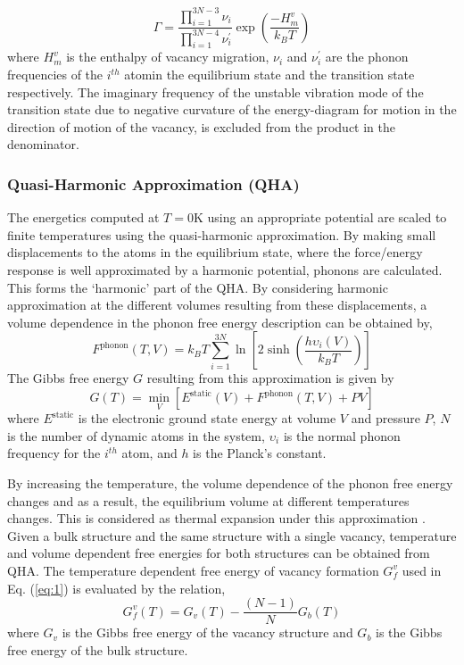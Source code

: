 \documentclass{article}
\begin{document}
%
\begin{equation} \label{eq:6}
\Gamma = \dfrac{\displaystyle \prod_{i=1}^{3N-3}\nu_i}{\displaystyle \prod_{i=1}^{3N-4}\nu_i^\prime} \exp\left(\dfrac{-H^v_m}{k_BT}\right)
\end{equation}
%
where $H^v_m$ is the enthalpy of vacancy migration, $\nu_i$ and $\nu_i^\prime$ are the phonon frequencies of the $i^{th}$ atomin the equilibrium state and the transition state respectively. The imaginary frequency of the unstable vibration mode of the transition state due to negative curvature of the energy-diagram for motion in the direction of motion of the vacancy, is excluded from the product in the denominator.

\subsubsection{Quasi-Harmonic Approximation (QHA)} 

\noindent The energetics computed at $T=0$K using an appropriate potential are scaled to finite temperatures using the quasi-harmonic approximation. By making small displacements to the atoms in the equilibrium state, where the force/energy response is well approximated by a harmonic potential, phonons are calculated. This forms the \enquote*{harmonic} part of the QHA. By considering harmonic approximation at the different volumes resulting from these displacements, a volume dependence in the phonon free energy description can be obtained by,
%
\begin{equation} \label{eq:7}
F^{\mathrm{phonon}}(T, V) = k_B T\sum_{i=1}^{3N} \ln \left[2 \sinh \left(\dfrac{h \upsilon_i(V)}{k_B T}\right)\right]
\end{equation}
%
The Gibbs free energy $G$ resulting from this approximation is given by
%
\begin{equation} \label{eq:8}
G(T)=\min_{V}[E^{\mathrm{static}}(V) +  F^{\mathrm{phonon}}(T, V) + PV]
\end{equation}
%
where $E^{\mathrm{static}}$ is the electronic ground state energy at volume $V$ and pressure $P$, $N$ is the number of dynamic atoms in the system, $\upsilon_i$ is the normal phonon frequency for the $i^{th}$ atom, and $h$ is the Planck's constant. 

By increasing the temperature, the volume dependence of the phonon free energy changes and as a result, the equilibrium volume at different temperatures changes. This is considered as thermal expansion under this approximation \cite{Togo2010}. Given a bulk structure and the same structure with a single vacancy, temperature and volume dependent free energies for both structures can be obtained from QHA. The temperature dependent free energy of vacancy formation $G^v_f$ used in Eq. (\ref{eq:1}) is evaluated by the relation,
%
\begin{equation} \label{eq:9}
G^v_f(T) = G_v(T)  - \dfrac{(N - 1)}{N} G_b(T)
\end{equation}
%
where $G_v$ is the Gibbs free energy of the vacancy structure and $G_b$ is the Gibbs free energy of the bulk structure. 
\end{document}
